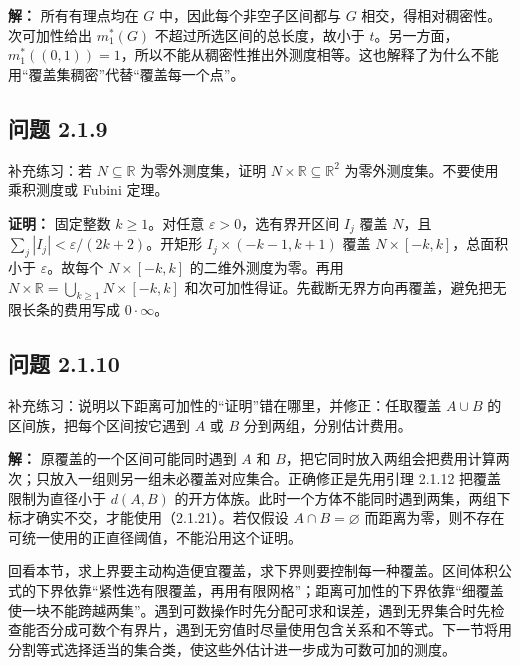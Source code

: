 \documentclass[11pt,a4paper]{article}
\begin{document}
\textbf{解：} 所有有理点均在 \(G\) 中，因此每个非空子区间都与 \(G\)
相交，得相对稠密性。次可加性给出 \(m_1^*(G)\)
不超过所选区间的总长度，故小于
\(t\)。另一方面，\(m_1^*((0,1))=1\)，所以不能从稠密性推出外测度相等。这也解释了为什么不能用``覆盖集稠密''代替``覆盖每一个点''。

\subsection{问题 2.1.9}\label{ux95eeux9898-2.1.9}

补充练习：若 \(N\subseteq\mathbb R\) 为零外测度集，证明
\(N\times\mathbb R\subseteq\mathbb R^2\)
为零外测度集。不要使用乘积测度或 Fubini 定理。

\textbf{证明：} 固定整数 \(k\ge1\)。对任意
\(\varepsilon>0\)，选有界开区间 \(I_j\) 覆盖 \(N\)，且
\(\sum_j|I_j|<\varepsilon/(2k+2)\)。开矩形 \(I_j\times(-k-1,k+1)\) 覆盖
\(N\times[-k,k]\)，总面积小于 \(\varepsilon\)。故每个 \(N\times[-k,k]\)
的二维外测度为零。再用 \(N\times\mathbb R=\bigcup_{k\ge1}N\times[-k,k]\)
和次可加性得证。先截断无界方向再覆盖，避免把无限长条的费用写成
\(0\cdot\infty\)。

\subsection{问题 2.1.10}\label{ux95eeux9898-2.1.10}

补充练习：说明以下距离可加性的``证明''错在哪里，并修正：任取覆盖
\(A\cup B\) 的区间族，把每个区间按它遇到 \(A\) 或 \(B\)
分到两组，分别估计费用。

\textbf{解：} 原覆盖的一个区间可能同时遇到 \(A\) 和
\(B\)，把它同时放入两组会把费用计算两次；只放入一组则另一组未必覆盖对应集合。正确修正是先用引理
2.1.12 把覆盖限制为直径小于 \(d(A,B)\)
的开方体族。此时一个方体不能同时遇到两集，两组下标才确实不交，才能使用（2.1.21）。若仅假设
\(A\cap B=\varnothing\)
而距离为零，则不存在可统一使用的正直径阈值，不能沿用这个证明。

回看本节，求上界要主动构造便宜覆盖，求下界则要控制每一种覆盖。区间体积公式的下界依靠``紧性选有限覆盖，再用有限网格''；距离可加性的下界依靠``细覆盖使一块不能跨越两集''。遇到可数操作时先分配可求和误差，遇到无界集合时先检查能否分成可数个有界片，遇到无穷值时尽量使用包含关系和不等式。下一节将用分割等式选择适当的集合类，使这些外估计进一步成为可数可加的测度。
\end{document}
